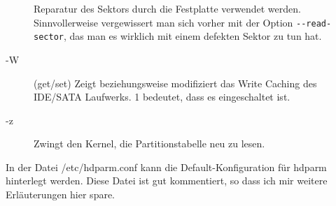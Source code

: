 \begin{normaltext}
\begin{description}
      Reparatur des Sektors durch die Festplatte verwendet werden.
      Sinnvollerweise vergewissert man sich vorher mit der Option
      \verb?--read-sector?, das man es wirklich mit einem defekten Sektor zu
      tun hat.
    \item[-W] (get/set) Zeigt beziehungsweise modifiziert das Write Caching
      des IDE/SATA Laufwerks. 1 bedeutet, dass es eingeschaltet ist.
    \item[-z] Zwingt den Kernel, die Partitionstabelle neu zu lesen.
  \end{description}
  In der Datei /etc/hdparm.conf kann die Default-Konfiguration für hdparm
  hinterlegt werden. Diese Datei ist gut kommentiert, so dass ich mir weitere
  Erläuterungen hier spare.
\end{normaltext}

